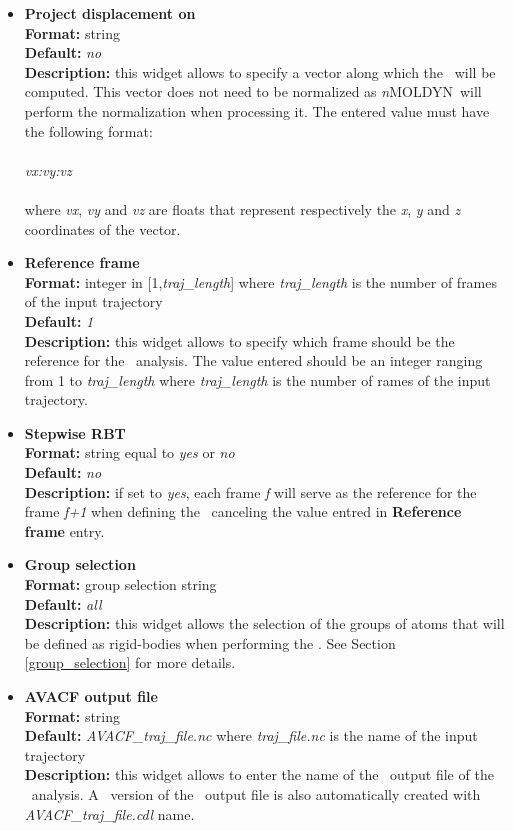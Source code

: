 \documentclass[a4paper,11pt]{report}
\newcommand{\NMOLDYN}{\textit{n}MOLDYN}
\begin{document}
\begin{itemize}
\item \textbf{Project displacement on}\\
\textbf{Format:} string\\
\textbf{Default:} \textit{no}\\
\textbf{Description:} this widget allows to specify a vector along which the \AVACF\ will be computed. This vector does not 
need to be normalized as \NMOLDYN\ will perform the normalization when processing it. The entered value must have the 
following format:
\\\\
\textit{vx:vy:vz}
\\\\
where \textit{vx}, \textit{vy} and \textit{vz} are floats that represent respectively the \textit{x}, \textit{y} and \textit{z} coordinates of the vector.

\item \textbf{Reference frame}\\
\textbf{Format:} integer in [1,\textit{traj\_length}] where \textit{traj\_length} is the number of frames of the input trajectory\\
\textbf{Default:} \textit{1}\\
\textbf{Description:} this widget allows to specify which frame should be the reference for the \AVACF\ analysis.
The value entered should be an integer ranging from 1 to \textit{traj\_length} where \textit{traj\_length} is the 
number of rames of the input trajectory.

\item \textbf{Stepwise RBT}\\
\textbf{Format:} string equal to \textit{yes} or \textit{no}\\
\textbf{Default:} \textit{no}\\
\textbf{Description:} if set to \textit{yes}, each frame \textit{f} will serve as the reference for the frame \textit{f+1} 
when defining the \RBT\ canceling the value entred in \textbf{Reference frame} entry.

\item \textbf{Group selection}\\
\textbf{Format:} group selection string\\
\textbf{Default:} \textit{all}\\
\textbf{Description:} this widget allows the selection of the groups of atoms that will be defined as rigid-bodies 
when performing the \AVACF . See Section \ref{group_selection} for more details.

\item \textbf{AVACF output file}\\
\textbf{Format:} string\\
\textbf{Default:} \textit{AVACF\_traj\_file.nc} where \textit{traj\_file.nc} is the name of the input trajectory\\
\textbf{Description:} this widget allows to enter the name of the \NetCDF\ output file of the \AVACF\ analysis. A \CDL\ 
version of the \NetCDF\ output file is also automatically created with \textit{AVACF\_traj\_file.cdl} name.
\end{itemize}
\end{document}
